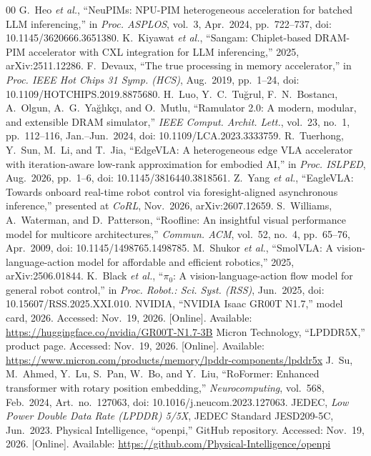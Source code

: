 \begin{thebibliography}{00}
 G.~Heo \emph{et al.}, ``NeuPIMs: NPU-PIM heterogeneous acceleration for batched LLM inferencing,'' in \emph{Proc. ASPLOS}, vol.~3, Apr.~2024, pp.~722--737, doi: 10.1145/3620666.3651380.
 K.~Kiyawat \emph{et al.}, ``Sangam: Chiplet-based DRAM-PIM accelerator with CXL integration for LLM inferencing,'' 2025, arXiv:2511.12286.
 F.~Devaux, ``The true processing in memory accelerator,'' in \emph{Proc. IEEE Hot Chips 31 Symp. (HCS)}, Aug.~2019, pp.~1--24, doi: 10.1109/HOTCHIPS.2019.8875680.
 H.~Luo, Y.~C.~Tu\u{g}rul, F.~N.~Bostanc{\i}, A.~Olgun, A.~G.~Ya\u{g}l{\i}k\c{c}{\i}, and O.~Mutlu, ``Ramulator 2.0: A modern, modular, and extensible DRAM simulator,'' \emph{IEEE Comput. Archit. Lett.}, vol.~23, no.~1, pp.~112--116, Jan.--Jun.~2024, doi: 10.1109/LCA.2023.3333759.
 R.~Tuerhong, Y.~Sun, M.~Li, and T.~Jia, ``EdgeVLA: A heterogeneous edge VLA accelerator with iteration-aware low-rank approximation for embodied AI,'' in \emph{Proc. ISLPED}, Aug.~2026, pp.~1--6, doi: 10.1145/3816440.3818561.
 Z.~Yang \emph{et al.}, ``EagleVLA: Towards onboard real-time robot control via foresight-aligned asynchronous inference,'' presented at \emph{CoRL}, Nov.~2026, arXiv:2607.12659.
 S.~Williams, A.~Waterman, and D.~Patterson, ``Roofline: An insightful visual performance model for multicore architectures,'' \emph{Commun. ACM}, vol.~52, no.~4, pp.~65--76, Apr.~2009, doi: 10.1145/1498765.1498785.
 M.~Shukor \emph{et al.}, ``SmolVLA: A vision-language-action model for affordable and efficient robotics,'' 2025, arXiv:2506.01844.
 K.~Black \emph{et al.}, ``$\pi_{0}$: A vision-language-action flow model for general robot control,'' in \emph{Proc. Robot.: Sci. Syst. (RSS)}, Jun.~2025, doi: 10.15607/RSS.2025.XXI.010.
 NVIDIA, ``NVIDIA Isaac GR00T N1.7,'' model card, 2026. Accessed: Nov.~19, 2026. [Online]. Available: \url{https://huggingface.co/nvidia/GR00T-N1.7-3B}
 Micron Technology, ``LPDDR5X,'' product page. Accessed: Nov.~19, 2026. [Online]. Available: \url{https://www.micron.com/products/memory/lpddr-components/lpddr5x}
 J.~Su, M.~Ahmed, Y.~Lu, S.~Pan, W.~Bo, and Y.~Liu, ``RoFormer: Enhanced transformer with rotary position embedding,'' \emph{Neurocomputing}, vol.~568, Feb.~2024, Art.~no.~127063, doi: 10.1016/j.neucom.2023.127063.
 JEDEC, \emph{Low Power Double Data Rate (LPDDR) 5/5X}, JEDEC Standard JESD209-5C, Jun.~2023.
 Physical Intelligence, ``openpi,'' GitHub repository. Accessed: Nov.~19, 2026. [Online]. Available: \url{https://github.com/Physical-Intelligence/openpi}

\end{thebibliography}
